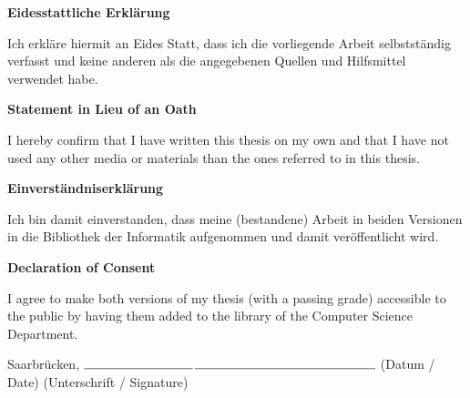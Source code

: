 \documentclass[12pt, a4paper, twoside]{Thesis} %
\begin{document}
% 



\pagestyle{empty} 
\begin{center}
\Large\textbf{Eidesstattliche Erklärung} \\
\end{center}
\noindent
Ich erkläre hiermit an Eides Statt, dass ich die vorliegende Arbeit selbstständig verfasst und keine
anderen als die angegebenen Quellen und Hilfsmittel verwendet habe.
 
\begin{center}
\Large\textbf{Statement in Lieu of an Oath} \\
\end{center}
\noindent
I hereby confirm that I have written this thesis on my own and that I have not used any other media or
materials than the ones referred to in this thesis.
\begin{center}
\Large\textbf{Einverständniserklärung} \\
\end{center}
\noindent
Ich bin damit einverstanden, dass meine (bestandene) Arbeit in beiden Versionen in die Bibliothek der
Informatik aufgenommen und damit veröffentlicht wird.
\begin{center}
\Large\textbf{Declaration of Consent} \\
\end{center}
\noindent
I agree to make both versions of my thesis (with a passing grade) accessible to the public by having
them added to the library of the Computer Science Department.

\vspace{4cm}
Saarbrücken, $\rule{3cm}{0.15mm}$\hspace{4cm}$\rule{5cm}{0.15mm}$ \newline
\hspace*{2.7cm}(Datum / Date) \hspace{4cm}(Unterschrift / Signature)

\end{document}
